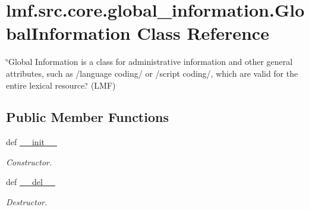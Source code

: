 \hypertarget{classlmf_1_1src_1_1core_1_1global__information_1_1_global_information}{\section{lmf.\+src.\+core.\+global\+\_\+information.\+Global\+Information Class Reference}
\label{classlmf_1_1src_1_1core_1_1global__information_1_1_global_information}
}


\char`\"{}\+Global Information is a class for administrative information and other general attributes, such as /language coding/ or /script coding/, which are valid for the entire lexical resource.\char`\"{} (L\+M\+F)  


\subsection*{Public Member Functions}
\begin{DoxyCompactItemize}
\item 
def \hyperlink{classlmf_1_1src_1_1core_1_1global__information_1_1_global_information_a8815a24e93798f1e253ba79ec38cb30f}{\+\_\+\+\_\+init\+\_\+\+\_\+}
\begin{DoxyCompactList}\small\item\em Constructor. \end{DoxyCompactList}\item 
def \hyperlink{classlmf_1_1src_1_1core_1_1global__information_1_1_global_information_a9ef2d1611e39e6d3802651da2b46ef1c}{\+\_\+\+\_\+del\+\_\+\+\_\+}
\begin{DoxyCompactList}\small\item\em Destructor. \end{DoxyCompactList}\end{DoxyCompactItemize}
